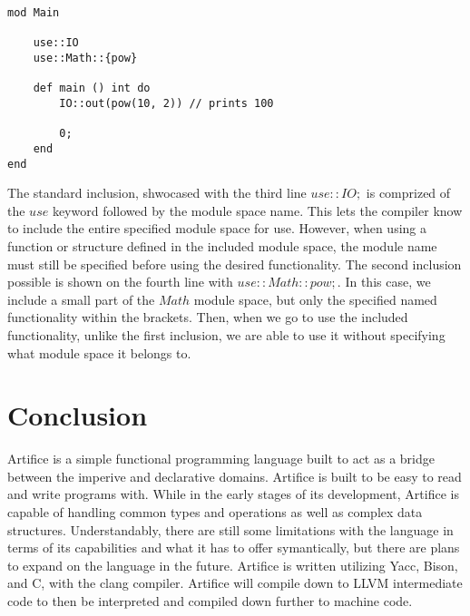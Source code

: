 \documentclass{article}
\begin{document}
\begin{lstlisting}
mod Main

	use::IO
	use::Math::{pow}

	def main () int do
		IO::out(pow(10, 2)) // prints 100

		0;
	end
end
\end{lstlisting}

The standard inclusion, shwocased with the third line $use::IO;$ is comprized of the $use$ keyword followed by the module space name. This lets the compiler know to include the
entire specified module space for use. However, when using a function or structure defined in the included module space, the module name must still be specified before using the desired
functionality. The second inclusion possible is shown on the fourth line with $use::Math::{pow};$. In this case, we include a small part of the $Math$ module space, but only the specified
named functionality within the brackets. Then, when we go to use the included functionality, unlike the first inclusion, we are able to use it without specifying what module space it belongs
to.


\section{Conclusion}

Artifice is a simple functional programming language built to act as a bridge between the imperive and declarative domains. Artifice is built to be easy to read and write programs with. While
in the early stages of its development, Artifice is capable of handling common types and operations as well as complex data structures. Understandably, there are still some limitations
with the language in terms of its capabilities and what it has to offer symantically, but there are plans to expand on the language in the future.
Artifice is written utilizing Yacc, Bison, and C, with the clang compiler. Artifice will compile down to LLVM intermediate code to then be interpreted and compiled down further
to machine code.
\end{document}
